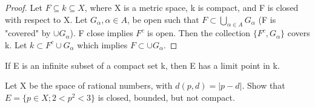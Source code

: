 \documentclass[11pt,fleqn]{book} %
\begin{document}
\begin{proof}
	Let $F \subseteq k \subseteq X$, where X is a metric space, k is compact, and F is closed with respect to X. Let $G_\alpha, \alpha \in A$, be open such that $F \subset \bigcup\limits_{\alpha \in A} G_\alpha$ (F is "covered" by $\cup G_\alpha$). F close implies $F^c$ is open. Then the collection $\{F^c, G_\alpha\}$ covers k. Let $k \subset F^c \cup G_\alpha$ which implies $F \subset \cup G_\alpha$. 
\end{proof}

\begin{theorem}
	If E is an infinite subset of a compact set k, then E has a limit point in k.
\end{theorem}

\begin{example}
	Let X be the space of rational numbers, with $d(p,d) = |p-d|$. Show that $E=\{p\in X; 2<p^2<3\}$ is closed, bounded, but not compact.
\end{example}







\end{document}
